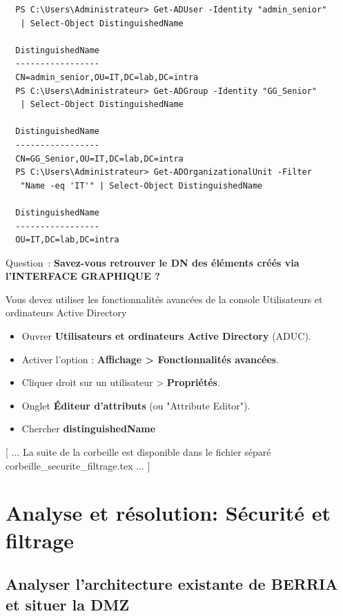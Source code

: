 \begin{verbatim}
  PS C:\Users\Administrateur> Get-ADUser -Identity "admin_senior"
   | Select-Object DistinguishedName
  
  DistinguishedName
  -----------------
  CN=admin_senior,OU=IT,DC=lab,DC=intra
  PS C:\Users\Administrateur> Get-ADGroup -Identity "GG_Senior"
   | Select-Object DistinguishedName
 
  DistinguishedName
  -----------------
  CN=GG_Senior,OU=IT,DC=lab,DC=intra
  PS C:\Users\Administrateur> Get-ADOrganizationalUnit -Filter
   "Name -eq 'IT'" | Select-Object DistinguishedName
  
  DistinguishedName
  -----------------
  OU=IT,DC=lab,DC=intra
\end{verbatim}

\vspace{1cm}

\noindent Question~: \textbf{Savez-vous retrouver le DN des éléments créés via l'INTERFACE GRAPHIQUE ?}

\noindent Vous devez utiliser les fonctionnalités avancées de la console Utilisateurs et ordinateurs Active Directory

\begin{itemize}
  \item Ouvrer \textbf{Utilisateurs et ordinateurs Active Directory} (ADUC).
  \item Activer l’option : \textbf{Affichage > Fonctionnalités avancées}.
  \item Cliquer droit sur un utilisateur > \textbf{Propriétés}.
  \item Onglet \textbf{Éditeur d’attributs} (ou "Attribute Editor").
  \item Chercher \textbf{distinguishedName}
\end{itemize}

\vspace{1cm}

[ ... La suite de la corbeille est disponible dans le fichier séparé \\ corbeille\_securite\_filtrage.tex ... ]

\newpage

\section*{Analyse et résolution: Sécurité et filtrage}

\subsection*{Analyser l'architecture existante de BERRIA et situer la DMZ}
{}

